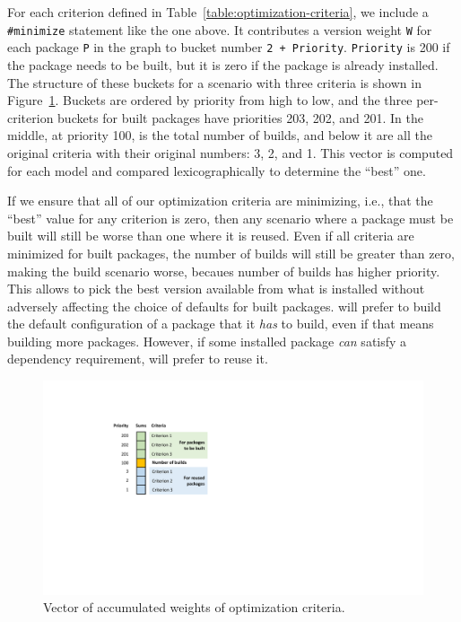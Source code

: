 For each criterion defined in Table~\ref{table:optimization-criteria}, we include a {\tt
  \#minimize} statement like the one above. It contributes a version weight {\tt W} for
each package {\tt P} in the graph to bucket number {\tt 2 + Priority}. {\tt Priority} is
200 if the package needs to be built, but it is zero if the package is already
installed. The structure of these buckets for a scenario with three criteria is shown in
Figure~\ref{fig:opt-vector}. Buckets are ordered by priority from high to low, and the
three per-criterion buckets for built packages have priorities 203, 202, and 201. In the
middle, at priority 100, is the total number of builds, and below it are all the
original criteria with their original numbers: 3, 2, and 1. This vector is computed for
each model and compared lexicographically to determine the ``best'' one.

If we ensure that all of our optimization criteria are minimizing, i.e., that the
``best'' value for any criterion is zero, then any scenario where a package must be
built will still be worse than one where it is reused. Even if all criteria are
minimized for built packages, the number of builds will still be greater than zero,
making the build scenario worse, becaues number of builds has higher priority. This
allows \spack{} to pick the best version available from what is installed without
adversely affecting the choice of defaults for built packages. \spack{} will prefer to
build the default configuration of a package that it {\it has} to build, even if that
means building more packages. However, if some installed package {\it can} satisfy a
dependency requirement, \spack{} will prefer to reuse it.

\begin{figure}
  \centering
  \includegraphics[width=.8\columnwidth]{figures/sums.pdf}
  \caption{
    Vector of accumulated weights of optimization criteria.
    \label{fig:opt-vector}
  }
\end{figure}

